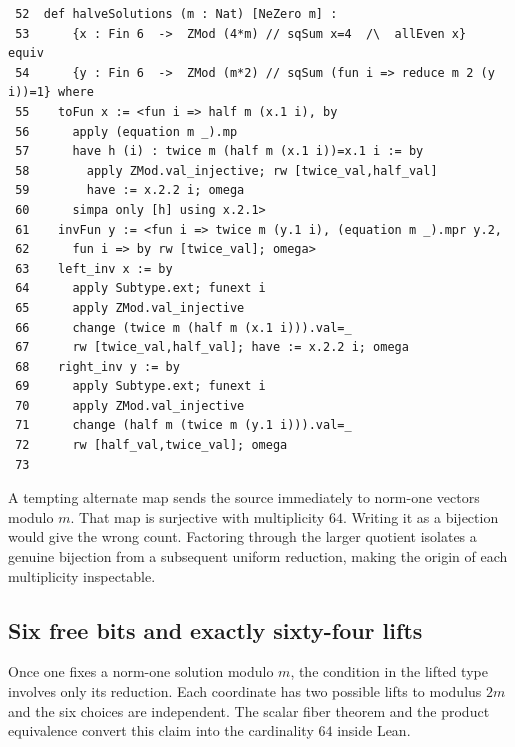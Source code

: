 \documentclass[12pt,letterpaper]{article}
\begin{document}
\par
{\fontsize{9.2}{11.2}\selectfont\begin{verbatim}
 52  def halveSolutions (m : Nat) [NeZero m] :
 53      {x : Fin 6  ->  ZMod (4*m) // sqSum x=4  /\  allEven x}  equiv
 54      {y : Fin 6  ->  ZMod (m*2) // sqSum (fun i => reduce m 2 (y i))=1} where
 55    toFun x := <fun i => half m (x.1 i), by
 56      apply (equation m _).mp
 57      have h (i) : twice m (half m (x.1 i))=x.1 i := by
 58        apply ZMod.val_injective; rw [twice_val,half_val]
 59        have := x.2.2 i; omega
 60      simpa only [h] using x.2.1>
 61    invFun y := <fun i => twice m (y.1 i), (equation m _).mpr y.2,
 62      fun i => by rw [twice_val]; omega>
 63    left_inv x := by
 64      apply Subtype.ext; funext i
 65      apply ZMod.val_injective
 66      change (twice m (half m (x.1 i))).val=_
 67      rw [twice_val,half_val]; have := x.2.2 i; omega
 68    right_inv y := by
 69      apply Subtype.ext; funext i
 70      apply ZMod.val_injective
 71      change (half m (twice m (y.1 i))).val=_
 72      rw [half_val,twice_val]; omega
 73
\end{verbatim}}
A tempting alternate map sends the source immediately to norm-one vectors modulo $m$. That map is surjective with multiplicity $64$. Writing it as a bijection would give the wrong count. Factoring through the larger quotient isolates a genuine bijection from a subsequent uniform reduction, making the origin of each multiplicity inspectable.
\clearpage{}\subsection*{Six free bits and exactly sixty-four lifts}\label{extract-FourEven74}
Once one fixes a norm-one solution modulo $m$, the condition in the lifted type involves only its reduction. Each coordinate has two possible lifts to modulus $2m$ and the six choices are independent. The scalar fiber theorem and the product equivalence convert this claim into the cardinality $64$ inside Lean.
\par
\end{document}

